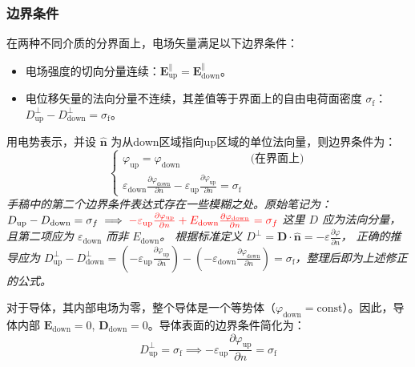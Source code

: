 \documentclass[fontset=none]{ctexart}
\begin{document}
\subsubsection{边界条件}
在两种不同介质的分界面上，电场矢量满足以下边界条件：
\begin{itemize}
    \item 电场强度的切向分量连续：$\bm{E}_{\text{up}}^{\parallel} = \bm{E}_{\text{down}}^{\parallel}$。
    \item 电位移矢量的法向分量不连续，其差值等于界面上的自由电荷面密度 $\sigma_{\mathrm{f}}$：$D_{\text{up}}^{\perp} - D_{\text{down}}^{\perp} = \sigma_{\mathrm{f}}$。
\end{itemize}
用电势表示，并设 $\bm{\hat{n}}$ 为从down区域指向up区域的单位法向量，则边界条件为：
\begin{equation}
    \begin{cases}
        \varphi_{\text{up}} = \varphi_{\text{down}} & \text{(在界面上)} \\
        \varepsilon_{\text{down}} \frac{\partial \varphi_{\text{down}}}{\partial n} - \varepsilon_{\text{up}} \frac{\partial \varphi_{\text{up}}}{\partial n} = \sigma_{\mathrm{f}}
    \end{cases}
\end{equation}
\textit{
    手稿中的第二个边界条件表达式存在一些模糊之处。原始笔记为：
$D_{\text{up}} - D_{\text{down}} = \sigma_f \implies \textcolor{red}{- \varepsilon_{\text{up}} \frac{\partial \varphi_{\text{up}}}{\partial n} + E_{\text{down}} \frac{\partial \varphi_{\text{down}}}{\partial n} = \sigma_f}$
这里 $D$ 应为法向分量，且第二项应为 $\varepsilon_{\text{down}}$ 而非 $E_{\text{down}}$。
根据标准定义 $D^{\perp} = \bm{D} \cdot \bm{\hat{n}} = -\varepsilon \frac{\partial \varphi}{\partial n}$，
正确的推导应为
$D_{\text{up}}^{\perp} - D_{\text{down}}^{\perp} = (-\varepsilon_{\text{up}} \frac{\partial \varphi_{\text{up}}}{\partial n}) - (-\varepsilon_{\text{down}} \frac{\partial \varphi_{\text{down}}}{\partial n}) = \sigma_{\mathrm{f}}$，整理后即为上述修正的公式。}

\begin{example}[导体边界]
对于导体，其内部电场为零，整个导体是一个等势体（$\varphi_{\text{down}} = \text{const}$）。因此，导体内部 $\bm{E}_{\text{down}}=0$, $\bm{D}_{\text{down}}=0$。导体表面的边界条件简化为：
\begin{equation}
    D_{\text{up}}^{\perp} = \sigma_{\mathrm{f}} \implies -\varepsilon_{\text{up}} \frac{\partial \varphi_{\text{up}}}{\partial n} = \sigma_{\mathrm{f}}
\end{equation}
\end{example}
\end{document}
